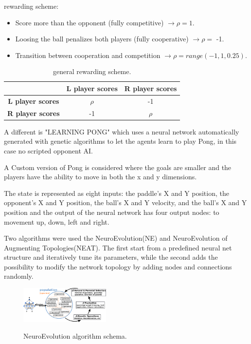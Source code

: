  rewarding scheme:
\begin{itemize}
  \item Score more than the opponent (fully competitive) $\rightarrow \rho = 1$.
  \item Loosing the ball penalizes both players (fully cooperative) $\rightarrow \rho = $ -1.
  \item Transition between cooperation and competition $\rightarrow \rho = range(-1, 1, 0.25)$.
\end{itemize}

\begin{table}[ht]
  \centering
  \begin{tabular}{c|c|c|}
    \cline{2-3}
                                                   & \textbf{L player scores} & \textbf{R player scores} \\ \hline
    \multicolumn{1}{|c|}{\textbf{L player scores}} & $\rho$                   & -1                       \\ \hline
    \multicolumn{1}{|c|}{\textbf{R player scores}} & -1                       & $\rho$                   \\ \hline
  \end{tabular}
  \caption{general rewarding scheme.}
  \label{tab:my-table2}
\end{table}


A different is "LEARNING PONG" which uses a neural network automatically generated with genetic algorithms to let the agents learn to play Pong, in this case no scripted opponent AI.

A Custom version of Pong is considered where the goals are smaller and the players have the ability to move in both the x and y dimensions.

The state is represented as eight inputs: the paddle's X and Y position, the opponent's X and Y position, the ball's X and Y velocity,
and the ball's X and Y position and the output of the neural network has four output nodes: to movement up, down, left and right.

Two algorithms were used the NeuroEvolution(NE) and NeuroEvolution of Augmenting Topologies(NEAT).
The first start from a predefined neural net structure and iteratively tune its parameters, while the second adds the possibility to modify the network topology by adding nodes and connections randomly.



\begin{figure}[ht]
  \centering
  \includegraphics[width=0.4\textwidth]{images/neuroevolution.png}
  \label{ne}
  \caption{NeuroEvolution algorithm schema.}
\end{figure}
